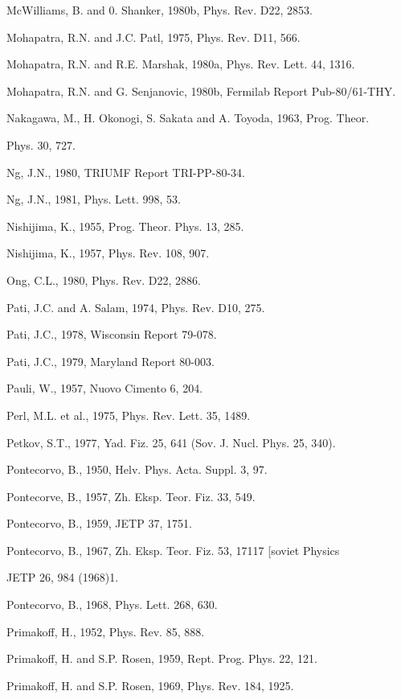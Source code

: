 \documentclass[twoside]{article}
\begin{document}
{{{{{{{{{{{{{{{{\begin{thebibliography}{10}
\bibitem{}
McWilliams, B. and 0. Shanker, 1980b, Phys. Rev. D22, 2853.

\bibitem{}
Mohapatra, R.N. and J.C. Patl, 1975, Phys. Rev. D11, 566.

\bibitem{}
Mohapatra, R.N. and R.E. Marshak, 1980a, Phys. Rev. Lett. 44, 1316.

\bibitem{}
Mohapatra, R.N. and G. Senjanovic, 1980b, Fermilab Report Pub-80/61-THY.

\bibitem{}
Nakagawa, M., H. Okonogi, S. Sakata and A. Toyoda, 1963, Prog. Theor.

\bibitem{}
Phys. 30, 727.

\bibitem{}
Ng, J.N., 1980, TRIUMF Report TRI-PP-80-34.

\bibitem{}
Ng, J.N., 1981, Phys. Lett. 998, 53.

\bibitem{}
Nishijima, K., 1955, Prog. Theor. Phys. 13, 285.

\bibitem{}
Nishijima, K., 1957, Phys. Rev. 108, 907.

\bibitem{}
Ong, C.L., 1980, Phys. Rev. D22, 2886.

\bibitem{}
Pati, J.C. and A. Salam, 1974, Phys. Rev. D10, 275.

\bibitem{}
Pati, J.C., 1978, Wisconsin Report 79-078.

\bibitem{}
Pati, J.C., 1979, Maryland Report 80-003.

\bibitem{}
Pauli, W., 1957, Nuovo Cimento 6, 204.

\bibitem{}
Perl, M.L. et al., 1975, Phys. Rev. Lett. 35, 1489.

\bibitem{}
Petkov, S.T., 1977, Yad. Fiz. 25, 641 (Sov. J. Nucl. Phys. 25, 340).

\bibitem{}
Pontecorvo, B., 1950, Helv. Phys. Acta. Suppl. 3, 97.

\bibitem{}
Pontecorve, B., 1957, Zh. Eksp. Teor. Fiz. 33, 549.

\bibitem{}
Pontecorvo, B., 1959, JETP 37, 1751.

\bibitem{}
Pontecorvo, B., 1967, Zh. Eksp. Teor. Fiz. 53, 17117 [soviet Physics

JETP 26, 984 (1968)1.

\bibitem{}
Pontecorvo, B., 1968, Phys. Lett. 268, 630.

\bibitem{}
Primakoff, H., 1952, Phys. Rev. 85, 888.

\bibitem{}
Primakoff, H. and S.P. Rosen, 1959, Rept. Prog. Phys. 22, 121.

\bibitem{}
Primakoff, H. and S.P. Rosen, 1969, Phys. Rev. 184, 1925.


\end{thebibliography}}}}}}}}}}}}}}}}}
\end{document}
